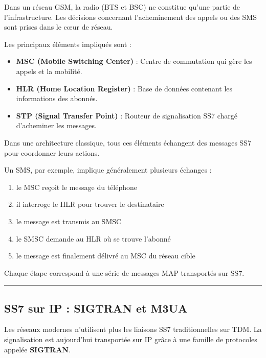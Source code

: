 \documentclass[
  french,
]{article}
\providecommand{\tightlist}{%
  \setlength{\itemsep}{0pt}\setlength{\parskip}{0pt}}
\begin{document}
Dans un réseau GSM, la radio (BTS et BSC) ne constitue qu'une partie de
l'infrastructure. Les décisions concernant l'acheminement des appels ou
des SMS sont prises dans le cœur de réseau.

Les principaux éléments impliqués sont :

\begin{itemize}
\tightlist
\item
  \textbf{MSC (Mobile Switching Center)} : Centre de commutation qui
  gère les appels et la mobilité.
\item
  \textbf{HLR (Home Location Register)} : Base de données contenant les
  informations des abonnés.
\item
  \textbf{STP (Signal Transfer Point)} : Routeur de signalisation SS7
  chargé d'acheminer les messages.
\end{itemize}

Dans une architecture classique, tous ces éléments échangent des
messages SS7 pour coordonner leurs actions.

Un SMS, par exemple, implique généralement plusieurs échanges :

\begin{enumerate}
\def\labelenumi{\arabic{enumi}.}
\tightlist
\item
  le MSC reçoit le message du téléphone
\item
  il interroge le HLR pour trouver le destinataire
\item
  le message est transmis au SMSC
\item
  le SMSC demande au HLR où se trouve l'abonné
\item
  le message est finalement délivré au MSC du réseau cible
\end{enumerate}

Chaque étape correspond à une série de messages MAP transportés sur SS7.

\begin{center}\rule{0.5\linewidth}{0.5pt}\end{center}

\subsection{SS7 sur IP : SIGTRAN et
M3UA}\label{ss7-sur-ip-sigtran-et-m3ua}

Les réseaux modernes n'utilisent plus les liaisons SS7 traditionnelles
sur TDM. La signalisation est aujourd'hui transportée sur IP grâce à une
famille de protocoles appelée \textbf{SIGTRAN}.
\end{document}
